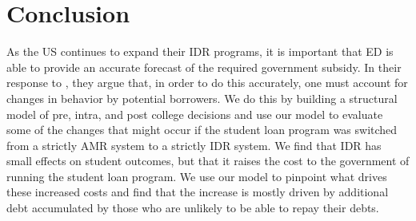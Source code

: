 
\section{Conclusion} \label{sec:conclusion}

As the US continues to expand their IDR programs, it is important that ED is able to provide an
accurate forecast of the required government subsidy. In their response to \cite{GAO-17-22}, they
argue that, in order to do this accurately, one must account for changes in behavior by potential
borrowers. We do this by building a structural model of pre, intra, and post college decisions and
use our model to evaluate some of the changes that might occur if the student loan program was
switched from a strictly AMR system to a strictly IDR system. We find that IDR has small effects on
student outcomes, but that it raises the cost to the government of running the student loan program.
We use our model to pinpoint what drives these increased costs and find that the increase is mostly
driven by additional debt accumulated by those who are unlikely to be able to repay their debts.
